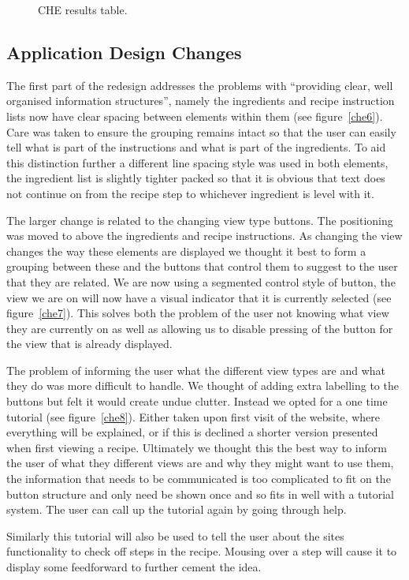 \begin{figure}[htbp]
  
  \caption{CHE results table.}
  \label{che2}
\end{figure}


\subsection{Application Design Changes}
The first part of the redesign addresses the problems with “providing clear, well organised information structures”, namely the ingredients and recipe instruction lists now have clear spacing between elements within them (see figure~\ref{che6}). Care was taken to ensure the grouping remains intact so that the user can easily tell what is part of the instructions and what is part of the ingredients. To aid this distinction further a different line spacing style was used in both elements, the ingredient list is slightly tighter packed so that it is obvious that text does not continue on from the recipe step to whichever ingredient is level with it.

The larger change is related to the changing view type buttons. The positioning was moved to above the ingredients and recipe instructions. As changing the view changes the way these elements are displayed we thought it best to form a grouping between these and the buttons that control them to suggest to the user that they are related. We are now using a segmented control style of button, the view we are on will now have a visual indicator that it is currently selected (see figure~\ref{che7}). This solves both the problem of the user not knowing what view they are currently on as well as allowing us to disable pressing of the button for the view that is already displayed.

The problem of informing the user what the different view types are and what they do was more difficult to handle. We thought of adding extra labelling to the buttons but felt it would create undue clutter. Instead we opted for a one time tutorial (see figure~\ref{che8}). Either taken upon first visit of the website, where everything will be explained, or if this is declined a shorter version presented when first viewing a recipe. Ultimately we thought this the best way to inform the user of what they different views are and why they might want to use them, the information that needs to be communicated is too complicated to fit on the button structure and only need be shown once and so fits in well with a tutorial system. The user can call up the tutorial again by going through help. 

Similarly this tutorial will also be used to tell the user about the sites functionality to check off steps in the recipe. Mousing over a step will cause it to display some feedforward to further cement the idea.
